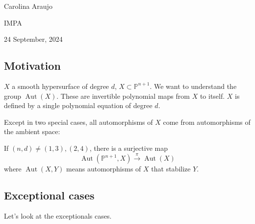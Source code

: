 \hfill{\Large Carolina Araujo}

{\Large \hfill IMPA}

\hfill{\large 24 September, 2024}

\subsection{Motivation}

$X$ a smooth hypersurface of degree $d $, $X\subset \mathbb{P}^{n+1}$. We want to understand the group $\operatorname{Aut}(X)$. These are invertible polynomial maps from $X$ to itself. $X$ is defined by a single polynomial equation of degree $d$.

\begin{thm}\leavevmode
	Except in two special cases, all automorphisms of $X$ come from automorphisms of the ambient space:
	
	If $(n,d)\neq (1,3),(2,4)$, there is a surjective map
	\[\operatorname{Aut}(\mathbb{P}^{n+1},X)\overset{\pi}{\longrightarrow}\operatorname{Aut}(X)\]
	where $\operatorname{Aut}(X,Y)$ means automorphisms of $X$ that stabilize  $Y$.
\end{thm}

\subsection{Exceptional cases}

Let's look at the exceptionals cases.

